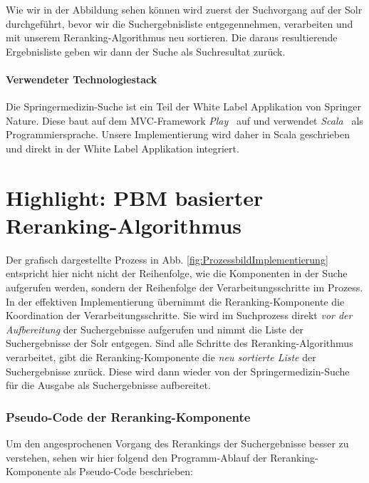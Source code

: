Wie wir in der Abbildung sehen können wird zuerst der Suchvorgang auf der Solr durchgeführt, bevor wir die Suchergebnisliste entgegennehmen, verarbeiten und mit unserem Reranking-Algorithmus neu sortieren. Die daraus resultierende Ergebnisliste geben wir dann der Suche als Suchresultat zurück. 

\paragraph{Verwendeter Technologiestack} 
Die Springermedizin-Suche ist ein Teil der White Label Applikation von Springer Nature. Diese baut auf dem MVC-Framework \textit{Play}~\cite{Play} auf und verwendet \textit{Scala}~\cite{Scala} als Programmiersprache. Unsere Implementierung wird daher in Scala geschrieben und direkt in der White Label Applikation integriert.

\section{Highlight: PBM basierter Reranking-Algorithmus}
\label{sec:Implementierung:PBM}

Der grafisch dargestellte Prozess in Abb. \ref{fig:ProzessbildImplementierung} entspricht hier nicht nicht der Reihenfolge, wie die Komponenten in der Suche aufgerufen werden, sondern der Reihenfolge der Verarbeitungsschritte im Prozess. In der effektiven Implementierung übernimmt die Reranking-Komponente die Koordination der Verarbeitungsschritte. Sie wird im Suchprozess direkt \textit{vor der Aufbereitung} der Suchergebnisse aufgerufen und nimmt die Liste der Suchergebnisse der Solr entgegen. Sind alle Schritte des Reranking-Algorithmus verarbeitet, gibt die Reranking-Komponente die \textit{neu sortierte Liste} der Suchergebnisse zurück. Diese wird dann wieder von der Springermedizin-Suche für die Ausgabe als Suchergebnisse aufbereitet.

\subsubsection{Pseudo-Code der Reranking-Komponente}
\label{sec:Implementierung:PBM:Pseudocode}

Um den angesprochenen Vorgang des Rerankings der Suchergebnisse besser zu verstehen, sehen wir hier folgend den Programm-Ablauf der Reranking-Komponente als Pseudo-Code beschrieben:

